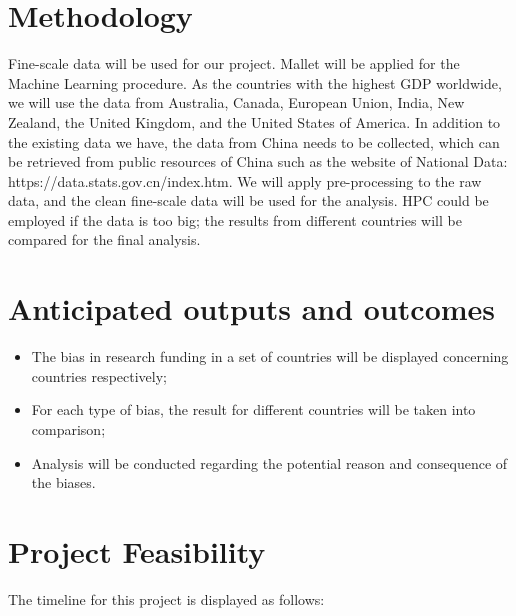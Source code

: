 \documentclass[11pt, oneside]{article}   	%
\begin{document}
\section{Methodology}
Fine-scale data will be used for our project. Mallet will be applied for the Machine Learning procedure. As the countries with the highest GDP worldwide, we will use the data from Australia, Canada, European Union, India, New Zealand, the United Kingdom, and the United States of America. In addition to the existing data we have, the data from China needs to be collected, which can be retrieved from public resources of China such as the website of National Data: https://data.stats.gov.cn/index.htm. 
We will apply pre-processing to the raw data, and the clean fine-scale data will be used for the analysis. HPC could be employed if the data is too big; the results from different countries will be compared for the final analysis.

\section{Anticipated outputs and outcomes}

\begin{itemize}
\item The bias in research funding in a set of countries will be displayed concerning countries respectively;
\item For each type of bias, the result for different countries will be taken into comparison;
\item Analysis will be conducted regarding the potential reason and consequence of the biases.

\end{itemize}

\section{Project Feasibility}

The timeline for this project is displayed as follows:
\end{document}
